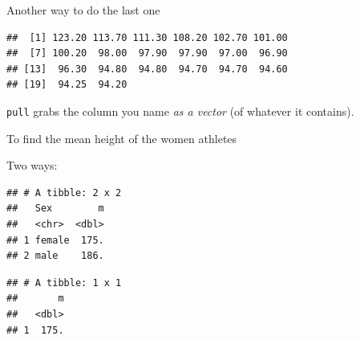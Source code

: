 \documentclass[
  ignorenonframetext,
]{beamer}
\newenvironment{Shaded}{\begin{snugshade}}{\end{snugshade}}
\newcommand{\DataTypeTok}[1]{\textcolor[rgb]{0.13,0.29,0.53}{#1}}
\newcommand{\DecValTok}[1]{\textcolor[rgb]{0.00,0.00,0.81}{#1}}
\newcommand{\KeywordTok}[1]{\textcolor[rgb]{0.13,0.29,0.53}{\textbf{#1}}}
\newcommand{\NormalTok}[1]{#1}
\newcommand{\OperatorTok}[1]{\textcolor[rgb]{0.81,0.36,0.00}{\textbf{#1}}}
\newcommand{\StringTok}[1]{\textcolor[rgb]{0.31,0.60,0.02}{#1}}
\begin{document}
\begin{frame}[fragile]{Another way to do the last one}
\protect\hypertarget{another-way-to-do-the-last-one}{}

\begin{Shaded}
\end{Shaded}

\begin{verbatim}
##  [1] 123.20 113.70 111.30 108.20 102.70 101.00
##  [7] 100.20  98.00  97.90  97.90  97.00  96.90
## [13]  96.30  94.80  94.80  94.70  94.70  94.60
## [19]  94.25  94.20
\end{verbatim}

\texttt{pull} grabs the column you name \emph{as a vector} (of whatever
it contains).

\end{frame}

\begin{frame}[fragile]{To find the mean height of the women athletes}
\protect\hypertarget{to-find-the-mean-height-of-the-women-athletes}{}

Two ways:

\small

\begin{Shaded}
\end{Shaded}

\begin{verbatim}
## # A tibble: 2 x 2
##   Sex        m
##   <chr>  <dbl>
## 1 female  175.
## 2 male    186.
\end{verbatim}

\begin{Shaded}
\end{Shaded}

\begin{verbatim}
## # A tibble: 1 x 1
##       m
##   <dbl>
## 1  175.
\end{verbatim}

\normalsize

\end{frame}
\end{document}
